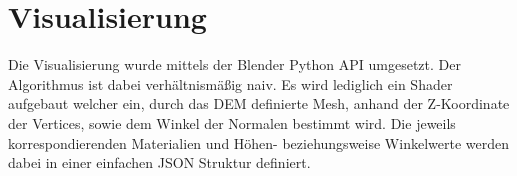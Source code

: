 \section {Visualisierung}

Die Visualisierung wurde mittels der Blender Python API umgesetzt. Der Algorithmus ist dabei verhältnismäßig naiv. Es wird lediglich ein Shader aufgebaut welcher ein, durch das \ac{DEM} definierte Mesh, anhand der Z-Koordinate der Vertices, sowie dem Winkel der Normalen bestimmt wird. Die jeweils korrespondierenden Materialien und Höhen- beziehungsweise Winkelwerte werden dabei in einer einfachen JSON Struktur definiert. 